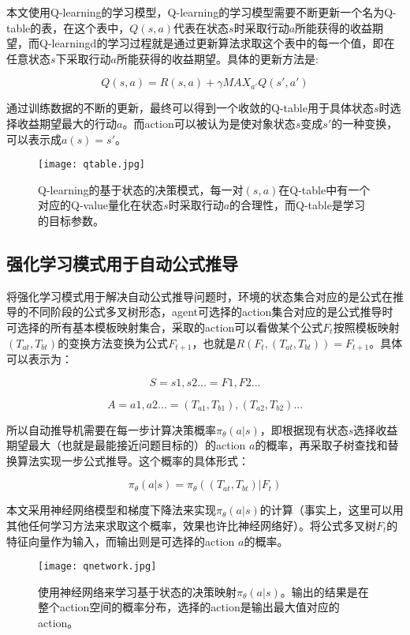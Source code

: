 \documentclass[runningheads]{llncs}
\begin{document}
本文使用Q-learning的学习模型\cite{ref_proc1}，Q-learning的学习模型需要不断更新一个名为Q-table的表，在这个表中，$Q(s,a)$代表在状态$s$时采取行动$a$所能获得的收益期望，而Q-learningd的学习过程就是通过更新算法求取这个表中的每一个值，即在任意状态$s$下采取行动$a$所能获得的收益期望。具体的更新方法是:

$$Q(s,a)=R(s,a)+\gamma MAX_{a'}Q(s',a') $$

通过训练数据的不断的更新，最终可以得到一个收敛的Q-table用于具体状态$s$时选择收益期望最大的行动$a$。而action可以被认为是使对象状态$s$变成$s'$的一种变换，可以表示成$a(s)=s'$。

\begin{figure}[H]
\centering
\texttt{[image: qtable.jpg]}
\caption{Q-learning的基于状态的决策模式，每一对$(s,a)$在Q-table中有一个对应的Q-value量化在状态$s$时采取行动$a$的合理性，而Q-table是学习的目标参数。}
\end{figure}

\subsection{强化学习模式用于自动公式推导}
将强化学习模式用于解决自动公式推导问题时，环境的状态集合对应的是公式在推导的不同阶段的公式多叉树形态，agent可选择的action集合对应的是公式推导时可选择的所有基本模板映射集合，采取的action可以看做某个公式$F_t$按照模板映射$(T_{at},T_{bt})$的变换方法变换为公式$F_{t+1}$，也就是$R(F_t,(T_{at},T_{bt}))=F_{t+1}$。具体可以表示为：

$$S={s1,s2...}={F1,F2...}$$

$$A={a1,a2...}={(T_{a1},T_{b1}),(T_{a2},T_{b2})...}$$

所以自动推导机需要在每一步计算决策概率$\pi_{\theta}(a|s)$，即根据现有状态$s$选择收益期望最大（也就是最能接近问题目标的）的action $a$的概率，再采取子树查找和替换算法实现一步公式推导。这个概率的具体形式：

$$\pi_{\theta}(a|s)=\pi_{\theta}((T_{at},T_{bt})|F_t)$$

本文采用神经网络模型和梯度下降法来实现$\pi_{\theta}(a|s)$的计算（事实上，这里可以用其他任何学习方法来求取这个概率，效果也许比神经网络好）。将公式多叉树$F_t$的特征向量作为输入，而输出则是可选择的action $a$的概率。

\begin{figure}[H]
\centering
\texttt{[image: qnetwork.jpg]}
\caption{使用神经网络来学习基于状态的决策映射$\pi_{\theta}(a|s)$。输出的结果是在整个action空间的概率分布，选择的action是输出最大值对应的action。}
\end{figure}
\end{document}
